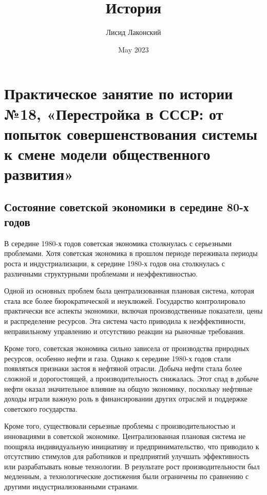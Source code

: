 \documentclass{article}
\title{История}
\author{Лисид Лаконский}
\date{May 2023}
\begin{document}
\raggedright

\maketitle
\tableofcontents
\pagebreak

\section{Практическое занятие по истории №18, «Перестройка в СССР: от попыток совершенствования системы к смене модели общественного развития»}

\subsection{Состояние советской экономики в середине 80-х годов}

В середине 1980-х годов советская экономика столкнулась с серьезными проблемами. Хотя советская экономика в прошлом периоде переживала периоды роста и индустриализации, к середине 1980-х годов она столкнулась с различными структурными проблемами и неэффективностью.

\hfill

Одной из основных проблем была централизованная плановая система, которая стала все более бюрократической и неуклюжей. Государство контролировало практически все аспекты экономики, включая производственные показатели, цены и распределение ресурсов. Эта система часто приводила к неэффективности, неправильному управлению и отсутствию реакции на рыночные требования.

\hfill

Кроме того, советская экономика сильно зависела от производства природных ресурсов, особенно нефти и газа. Однако к середине 1980-х годов стали появляться признаки застоя в нефтяной отрасли. Добыча нефти стала более сложной и дорогостоящей, а производительность снижалась. Этот спад в добыче нефти оказал значительное влияние на общую экономику, поскольку нефтяные доходы играли важную роль в финансировании других отраслей и поддержке советского государства.

\hfill

Кроме того, существовали серьезные проблемы с производительностью и инновациями в советской экономике. Централизованная плановая система не поощряла индивидуальную инициативу и предпринимательство, что приводило к отсутствию стимулов для работников и предприятий улучшать эффективность или разрабатывать новые технологии. В результате рост производительности был медленным, а технологические достижения были ограничены по сравнению с другими индустриализованными странами.
\end{document}
